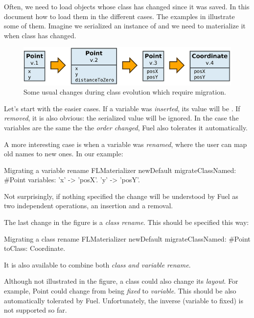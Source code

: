\documentclass[a4paper,10pt,twoside]{book}
\begin{document}
Often, we need to load objects whose class has changed since it was saved. In this document how to load them in the different cases. The examples in  illustrate some of them. Imagine we serialized an instance of  and we need to materialize it when  class has changed.

\begin{figure}[t]\centering
        \includegraphics[width=\linewidth]{ClassChanges.png}
        \caption{Some usual changes during class evolution which require migration.}
\end{figure}

Let's start with the easier cases. If a variable was \emph{inserted}, its value will be . If \emph{removed}, it is also obvious: the serialized value will be ignored. In the case the variables are the same the the \emph{order changed}, Fuel also tolerates it automatically.

A more interesting case is when a variable was \emph{renamed}, where the user can map old names to new ones. In our example:

\begin{code}{Migrating a variable rename}
FLMaterializer newDefault
	migrateClassNamed: #Point
	variables: {'x' -> 'posX'. 'y' -> 'posY'}.
\end{code}

Not surprisingly, if nothing specified the change will be understood by Fuel as two independent operations, an insertion and a removal.

The last change in the figure is a \emph{class rename}. This should be specified this way:

\begin{code}{Migrating a class rename}
FLMaterializer newDefault
	migrateClassNamed: #Point
	toClass: Coordinate.
\end{code}

It is also available  to combine both \emph{class and variable rename}.

Although not illustrated in the figure, a class could also change its \emph{layout}. For example, Point could change from being \emph{fixed} to \emph{variable}. This should be also automatically tolerated by Fuel. Unfortunately, the inverse (variable to fixed) is not supported so far.
\end{document}
